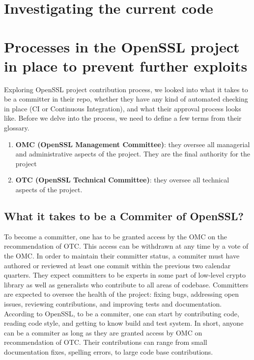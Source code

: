 \documentclass[conference]{IEEEtran}
\begin{document}
\section{Investigating the current code}

\section{Processes in the OpenSSL project in place to prevent further exploits}
   Exploring OpenSSL project contribution process,
we looked into what it takes to be a committer in their repo, whether
they have any kind of automated checking in place (CI or Continuous Integration),
and what their approval process looks like.
    Before we delve into the process, we need to define a few terms from
their glossary.
    \begin{enumerate}
        \item \textbf{OMC (OpenSSL Management Committee)}: they oversee all
        managerial and administrative aspects of the project. They are
        the final authority for the project\cite{6}
        \item \textbf{OTC (OpenSSL Technical Committee)}: they oversee all
        technical aspects of the project\cite{6}.
    \end{enumerate}
\subsection{What it takes to be a Commiter of OpenSSL?}
    To become a committer, one has to be granted access by the OMC on
the recommendation of OTC\cite{7}. This access can be withdrawn at any time by
a vote of the OMC\cite{8}. In order to maintain their committer status,
a commiter must have authored or reviewed at least one commit within the
previous two calendar quarters\cite{8}.
    They expect committers to be experts in some part of low-level
crypto library as well as generalists who contribute to all areas of
codebase\cite{7}. Committers are expected to oversee the health of the
project: fixing bugs, addressing open issues, reviewing contributions, and
improving tests and documentation\cite{7}. According to OpenSSL, to be a commiter,
one can start by contributing code, reading code style, and getting to know
build and test system\cite{7}. In short, anyone can be a
commiter as long as they are granted access by OMC on recommendation of OTC.
Their contributions can range from small documentation fixes, spelling errors,
to large code base contributions.
\end{document}
